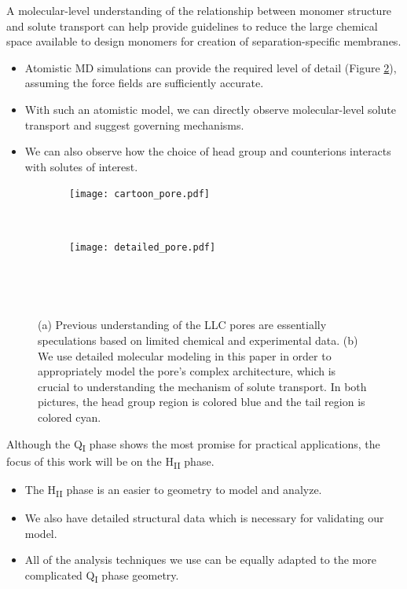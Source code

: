   A molecular-level understanding of the relationship between monomer structure
  and solute transport can help provide guidelines to reduce the
  large chemical space available to design monomers for creation of
  separation-specific membranes.
  \begin{itemize}
    \item Atomistic MD simulations can provide the required level of detail 
    (Figure \ref{fig:detailed_pore}), assuming the force fields are sufficiently accurate. 
    \item With such an atomistic model, we can directly observe
    molecular-level solute transport and suggest governing mechanisms. 
    \item We can also observe how the choice of head group and counterions interacts
    with solutes of interest. 
  \end{itemize}

  \begin{figure}[!htb]
  \centering
	\begin{subfigure}{0.45\linewidth}
		\centering
		\texttt{[image: cartoon\_pore.pdf]}
		\caption{}~\label{fig:undetailed_pore}
	\end{subfigure}
	\begin{subfigure}{0.45\linewidth}
		\centering
		\texttt{[image: detailed\_pore.pdf]}
		\caption{}~\label{fig:detailed_pore}
	\end{subfigure} 
    \caption{(a) Previous understanding of the LLC pores are essentially speculations 
    based on limited chemical and experimental data. (b) We use detailed molecular 
    modeling in this paper in order to appropriately model the pore's complex architecture,
    which is crucial to understanding the mechanism of solute transport. In both 
    pictures, the head group region is colored blue and the tail region is colored cyan.}~\label{fig:detail}
  \end{figure}

  Although the Q\textsubscript{I} phase shows the most promise for
  practical applications, the focus of this work will be on the H\textsubscript{II}
  phase.
  \begin{itemize}
    \item The H\textsubscript{II} phase is an easier to geometry to model
    and analyze.
    \item We also have detailed structural data which is necessary for validating
    our model.
    \item All of the analysis techniques we use can be equally adapted to
    the more complicated Q\textsubscript{I} phase geometry.
  \end{itemize}
  
